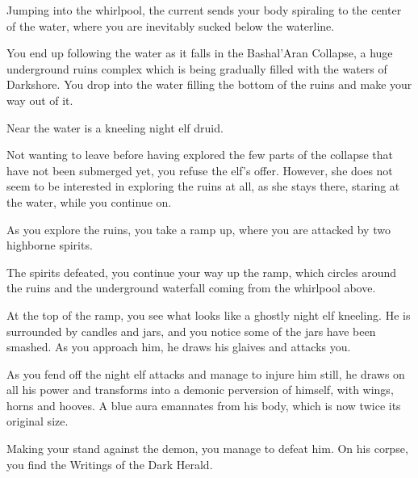 Jumping into the whirlpool, the current sends your body spiraling to the center of the water, where you are inevitably sucked below the waterline.

You end up following the water as it falls in the Bashal'Aran Collapse, a huge underground ruins complex which is being gradually filled with the waters of Darkshore. You drop into the water filling the bottom of the ruins and make your way out of it.

Near the water is a kneeling night elf druid.


Not wanting to leave before having explored the few parts of the collapse that have not been submerged yet, you refuse the elf's offer. However, she does not seem to be interested in exploring the ruins at all, as she stays there, staring at the water, while you continue on.

As you explore the ruins, you take a ramp up, where you are attacked by two highborne spirits.




The spirits defeated, you continue your way up the ramp, which circles around the ruins and the underground waterfall coming from the whirlpool above.

At the top of the ramp, you see what looks like a ghostly night elf kneeling. He is surrounded by candles and jars, and you notice some of the jars have been smashed. As you approach him, he draws his glaives and attacks you.


As you fend off the night elf attacks and manage to injure him still, he draws on all his power and transforms into a demonic perversion of himself, with wings, horns and hooves. A blue aura emannates from his body, which is now twice its original size.


Making your stand against the demon, you manage to defeat him. On his corpse, you find the Writings of the Dark Herald.

